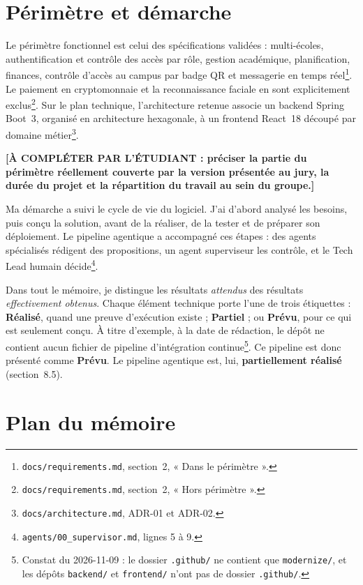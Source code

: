 \section*{Périmètre et démarche}

Le périmètre fonctionnel est celui des spécifications validées : multi-écoles, authentification et contrôle des accès par rôle, gestion académique, planification, finances, contrôle d'accès au campus par badge QR et messagerie en temps réel\footnote{\nolinkurl{docs/requirements.md}, section~2, « Dans le périmètre ».}. Le paiement en cryptomonnaie et la reconnaissance faciale en sont explicitement exclus\footnote{\nolinkurl{docs/requirements.md}, section~2, « Hors périmètre ».}. Sur le plan technique, l'architecture retenue associe un backend Spring Boot~3, organisé en architecture hexagonale, à un frontend React~18 découpé par domaine métier\footnote{\nolinkurl{docs/architecture.md}, ADR-01 et ADR-02.}.

\textbf{[À COMPLÉTER PAR L'ÉTUDIANT : préciser la partie du périmètre réellement couverte par la version présentée au jury, la durée du projet et la répartition du travail au sein du groupe.]}

Ma démarche a suivi le cycle de vie du logiciel. J'ai d'abord analysé les besoins, puis conçu la solution, avant de la réaliser, de la tester et de préparer son déploiement. Le pipeline agentique a accompagné ces étapes : des agents spécialisés rédigent des propositions, un agent superviseur les contrôle, et le Tech Lead humain décide\footnote{\nolinkurl{agents/00_supervisor.md}, lignes 5 à 9.}.

Dans tout le mémoire, je distingue les résultats \emph{attendus} des résultats \emph{effectivement obtenus}. Chaque élément technique porte l'une de trois étiquettes : \textbf{Réalisé}, quand une preuve d'exécution existe ; \textbf{Partiel} ; ou \textbf{Prévu}, pour ce qui est seulement conçu. À titre d'exemple, à la date de rédaction, le dépôt ne contient aucun fichier de pipeline d'intégration continue\footnote{Constat du 2026-11-09 : le dossier \nolinkurl{.github/} ne contient que \nolinkurl{modernize/}, et les dépôts \nolinkurl{backend/} et \nolinkurl{frontend/} n'ont pas de dossier \nolinkurl{.github/}.}. Ce pipeline est donc présenté comme \textbf{Prévu}. Le pipeline agentique est, lui, \textbf{partiellement réalisé} (section~8.5).

\section*{Plan du mémoire}


